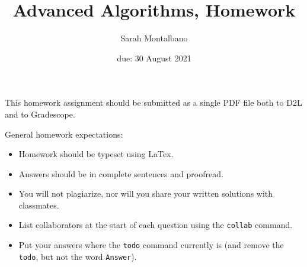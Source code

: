 \documentclass{article}
\title{Advanced Algorithms, Homework \hwnum}
\author{Sarah Montalbano}
\date{due: 30 August 2021}
\begin{document}
\maketitle

This homework assignment should be
submitted as a single PDF file both to D2L and to Gradescope.

General homework expectations:
\begin{itemize}
    \item Homework should be typeset using LaTex.
    \item Answers should be in complete sentences and proofread.
    \item You will not plagiarize, nor will you share your written solutions
        with classmates.
    \item List collaborators at the start of each question using the
        \texttt{collab} command.
    \item Put your answers where the \texttt{todo} command currently is (and
        remove the \texttt{todo}, but not the word \texttt{Answer}).
\end{itemize}

\end{document}
